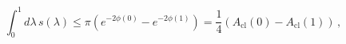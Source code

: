 \begin{equation}
\int_0^1 d\lambda\, s(\lambda) \leq \pi \left( e^{-2\phi(0)} -
e^{-2\phi(1)} \right) = \frac{1}{4} \left(A_{\text{cl}}(0) -
A_{\text{cl}}(1)\right) \, ,
\end{equation}

